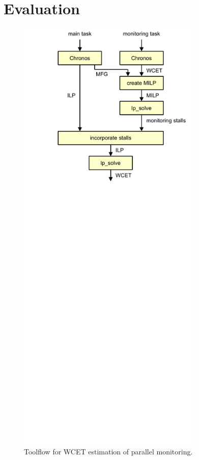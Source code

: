 \section{Evaluation}
\label{sec:monitoring_wcet.evaluation}

\begin{figure}
  \begin{center}
    \includegraphics[width=3.5in]{monitoring_wcet/figs/toolflow.pdf}
    \caption{Toolflow for WCET estimation of parallel monitoring.}
    \label{fig:monitoring_wcet.evaluation.toolflow}
  \end{center}
\end{figure}

